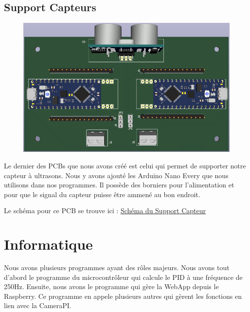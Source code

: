 \documentclass[
	a4paper,									%
	11pt,										%
	twoside,									%
	openright,									%
	notitlepage,									%
	parskip=half,								%
]{scrreprt}										%
\begin{document}
\section{Support Capteurs}

\begin{figure}[!ht]
	\centering
	\includegraphics[scale=.5]{img/Capteur.png}
	\label{SupportCapteur}
\end{figure}

Le dernier des PCBs que nous avons créé est celui qui permet de supporter notre capteur à ultrasons. Nous y avons
ajouté les Arduino Nano Every que nous utilisons dans nos programmes. Il possède des borniers pour l'alimentation
et pour que le signal du capteur puisse être ammené au bon endroit. \par

Le schéma pour ce PCB se trouve ici : \href{run:./Schema_SupportCapteur.pdf}{Schéma du Support Capteur}



\chapter{Informatique}

Nous avons plusieurs programmes ayant des rôles majeurs. Nous avons tout d'abord le programme du 
microcontrôleur qui calcule le PID à une fréquence de 250Hz. Ensuite, nous avons le programme qui gère
la WebApp depuis le Raspberry. Ce programme en appele plusieurs autres qui gèrent les fonctions en lien 
avec la CameraPI. \par
\end{document}
